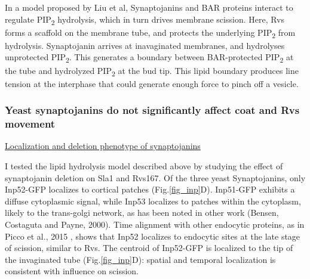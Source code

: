 \vspace{5mm}
In a model proposed by Liu et al, Synaptojanins and BAR proteins interact to regulate PIP\textsubscript{2} hydrolysis, which in turn drives membrane scission. Here, Rvs forms a scaffold on the membrane tube, and protects the underlying	PIP\textsubscript{2}  from hydrolysis. Synaptojanin arrives at inavaginated membranes, and hydrolyses unprotected	PIP\textsubscript{2}. This generates a boundary between BAR-protected 	PIP\textsubscript{2} at the tube and hydrolyzed PIP\textsubscript{2} at the bud tip. This lipid boundary produces line tension at the interphase that could generate enough force to pinch off a vesicle. 


	\subsubsection{Yeast synaptojanins do not significantly affect coat and Rvs movement } 
	
\underline{Localization and deletion phenotype of synaptojanins}

I tested the lipid hydrolysis model described above by studying the effect of synaptojanin deletion on Sla1 and Rvs167. 
Of the three yeast Synaptojanins, only Inp52-GFP localizes to cortical patches (Fig.\ref{fig_inp}D). Inp51-GFP exhibits a diffuse cytoplasmic signal, while Inp53 localizes to patches within the cytoplasm, likely to the trans-golgi network, as has been noted in other work (Bensen, Costaguta and Payne, 2000). Time alignment with other endocytic proteins, as in Picco et al., 2015 , shows that Inp52 localizes to endocytic sites at the late stage of scission, similar to Rvs. The centroid of Inp52-GFP is localized to the tip of the invaginated tube (Fig.\ref{fig_inp}D): spatial and temporal localization is consistent with influence on scission. 


